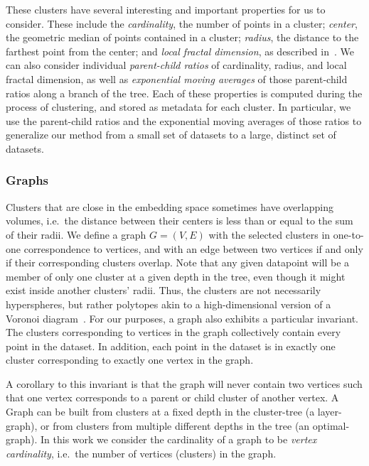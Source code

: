 These clusters have several interesting and important properties for us to consider.
These include the \textit{cardinality}, the number of points in a cluster;
\textit{center}, the geometric median of points contained in a cluster;
\textit{radius}, the distance to the farthest point from the center;
and \textit{local fractal dimension}, as described in~\cite{ishaq2019clustered}.
We can also consider individual \textit{parent-child ratios} of cardinality, radius, and local fractal dimension, as well as \textit{exponential moving averages} of those parent-child ratios along a branch of the tree.
Each of these properties is computed during the process of clustering, and stored as metadata for each cluster.
In particular, we use the parent-child ratios and the exponential moving averages of those ratios to generalize our method from a small set of datasets to a large, distinct set of datasets.

\subsubsection{Graphs}
Clusters that are close in the embedding space sometimes have overlapping volumes, i.e.\ the distance between their centers is less than or equal to the sum of their radii.
We define a graph $G=(V,E)$ with the selected clusters in one-to-one correspondence to vertices, and with an edge between two vertices if and only if their corresponding clusters overlap.
Note that any given datapoint will be a member of only one cluster at a given depth in the tree, even though it might exist inside another clusters' radii.
Thus, the clusters are not necessarily hyperspheres, but rather polytopes akin to a high-dimensional version of a Voronoi diagram~\cite{voronoi1908nouvelles}.
For our purposes, a graph also exhibits a particular invariant.
The clusters corresponding to vertices in the graph collectively contain every point in the dataset.
In addition, each point in the dataset is in exactly one cluster corresponding to exactly one vertex in the graph.

A corollary to this invariant is that the graph will never contain two vertices such that one vertex corresponds to a parent or child cluster of another vertex.
A Graph can be built from clusters at a fixed depth in the cluster-tree (a layer-graph), or from clusters from multiple different depths in the tree (an optimal-graph).
In this work we consider the cardinality of a graph to be \textit{vertex cardinality}, i.e.\ the number of vertices (clusters) in the graph.

